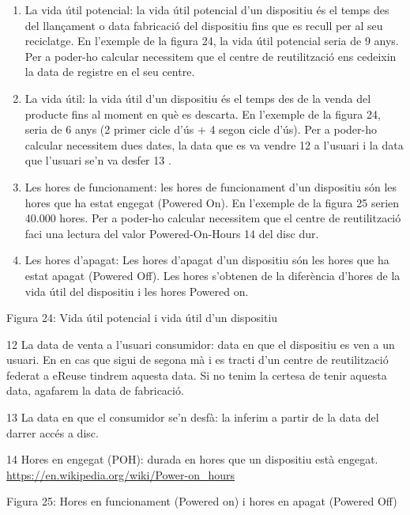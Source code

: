 \documentclass[
]{book}
\begin{document}
\begin{enumerate}
\def\labelenumi{\arabic{enumi}.}
\item
  La vida útil potencial: la vida útil potencial d'un dispositiu és el temps des del llançament o data fabricació del dispositiu fins que es recull per al seu reciclatge. En l'exemple de la figura 24, la vida útil potencial seria de 9 anys. Per a poder-ho calcular necessitem que el centre de reutilització ens cedeixin la data de registre en el seu centre.
\item
  La vida útil: la vida útil d'un dispositiu és el temps des de la venda del producte fins al moment en què es descarta. En l'exemple de la figura 24, seria de 6 anys (2 primer cicle d'ús + 4 segon cicle d'ús). Per a poder-ho calcular necessitem dues dates, la data que es va vendre 12 a l'usuari i la data que l'usuari se'n va desfer 13 .
\item
  Les hores de funcionament: les hores de funcionament d'un dispositiu són les hores que ha estat engegat (Powered On). En l'exemple de la figura 25 serien 40.000 hores. Per a poder-ho calcular necessitem que el centre de reutilització faci una lectura del valor Powered-On-Hours 14 del disc dur.
\item
  Les hores d'apagat: Les hores d'apagat d'un dispositiu són les hores que ha estat apagat (Powered Off). Les hores s'obtenen de la diferència d'hores de la vida útil del dispositiu i les hores Powered on.
\end{enumerate}

Figura 24: Vida útil potencial i vida útil d'un dispositiu

12 La data de venta a l'usuari consumidor: data en que el dispositiu es ven a un usuari. En en cas que sigui de segona mà i es tracti d'un centre de reutilització federat a eReuse tindrem aquesta data. Si no tenim la certesa de tenir aquesta data, agafarem la data de fabricació.

13 La data en que el consumidor se'n desfà: la inferim a partir de la data del darrer accés a disc.

14 Hores en engegat (POH): durada en hores que un dispositiu està engegat. \url{https://en.wikipedia.org/wiki/Power-on_hours}

Figura 25: Hores en funcionament (Powered on) i hores en apagat (Powered Off)
\end{document}
